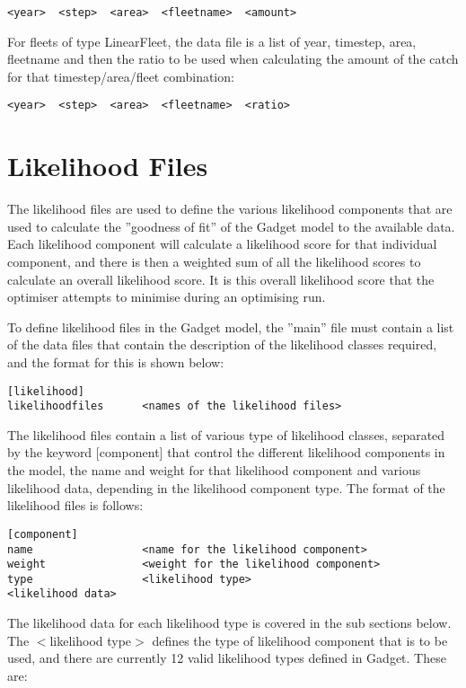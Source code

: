 \documentclass [a4paper, 10pt]{book}
\begin{document}
{\small\begin{verbatim}
<year>  <step>  <area>  <fleetname>  <amount>
\end{verbatim}}

For fleets of type LinearFleet, the data file is a list of year, timestep, area, fleetname and then the ratio to be used when calculating the amount of the catch for that timestep/area/fleet combination:

{\small\begin{verbatim}
<year>  <step>  <area>  <fleetname>  <ratio>
\end{verbatim}}

\chapter{Likelihood Files}\label{chap:like}
The likelihood files are used to define the various likelihood components that are used to calculate the ''goodness of fit'' of the Gadget model to the available data.  Each likelihood component will calculate a likelihood score for that individual component, and there is then a weighted sum of all the likelihood scores to calculate an overall likelihood score.  It is this overall likelihood score that the optimiser attempts to minimise during an optimising run.

\bigskip
To define likelihood files in the Gadget model, the ''main'' file must contain a list of the data files that contain the description of the likelihood classes required, and the format for this is shown below:

{\small\begin{verbatim}
[likelihood]
likelihoodfiles      <names of the likelihood files>
\end{verbatim}}

The likelihood files contain a list of various type of likelihood classes, separated by the keyword [component] that control the different likelihood components in the model, the name and weight for that likelihood component and various likelihood data, depending in the likelihood component type.  The format of the likelihood files is follows:

{\small\begin{verbatim}
[component]
name                 <name for the likelihood component>
weight               <weight for the likelihood component>
type                 <likelihood type>
<likelihood data>
\end{verbatim}}

The likelihood data for each likelihood type is covered in the sub sections below.  The $<$likelihood type$>$ defines the type of likelihood component that is to be used, and there are currently 12 valid likelihood types defined in Gadget.  These are:
\end{document}
